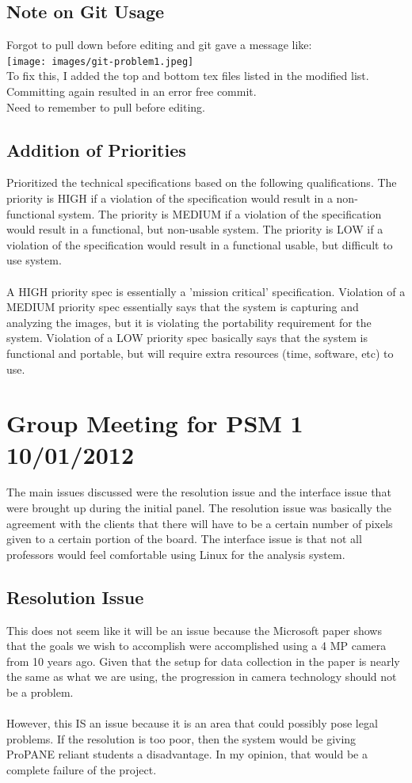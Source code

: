 \documentclass[]{article}
\begin{document}
		\subsection{Note on Git Usage}
			Forgot to pull down before editing and git gave a message like:\\
			\texttt{[image: images/git-problem1.jpeg]}\\
			To fix this, I added the top and bottom tex files listed in the modified list. Committing again resulted in an error free commit.\\
			Need to remember to pull before editing. 
			
		\subsection{Addition of Priorities}
			Prioritized the technical specifications based on the following qualifications. The priority is HIGH if a violation of the specification would result in a non-functional system. The priority is MEDIUM if a violation of the specification would result in a functional, but non-usable system. The priority is LOW if a violation of the specification would result in a functional usable, but difficult to use system. \\
			\\
			A HIGH priority spec is essentially a 'mission critical' specification. Violation of a MEDIUM priority spec essentially says that the system is capturing and analyzing the images, but it is violating the portability requirement for the system. Violation of a LOW priority spec basically says that the system is functional and portable, but will require extra resources (time, software, etc) to use.
			
	\section{Group Meeting for PSM 1 10/01/2012}
		The main issues discussed were the resolution issue and the interface issue that were brought up during the initial panel. The resolution issue was basically the agreement with the clients that there will have to be a certain number of pixels given to a certain portion of the board. The interface issue is that not all professors would feel comfortable using Linux for the analysis system. 
		
		\subsection{Resolution Issue}
			This does not seem like it will be an issue because the Microsoft paper shows that the goals we wish to accomplish were accomplished using a 4 MP camera from 10 years ago. Given that the setup for data collection in the paper is nearly the same as what we are using, the progression in camera technology should not be a problem.\\
			\\
			However, this IS an issue because it is an area that could possibly pose legal problems. If the resolution is too poor, then the system would be giving ProPANE reliant students a disadvantage. In my opinion, that would be a complete failure of the project.
			
\end{document}
